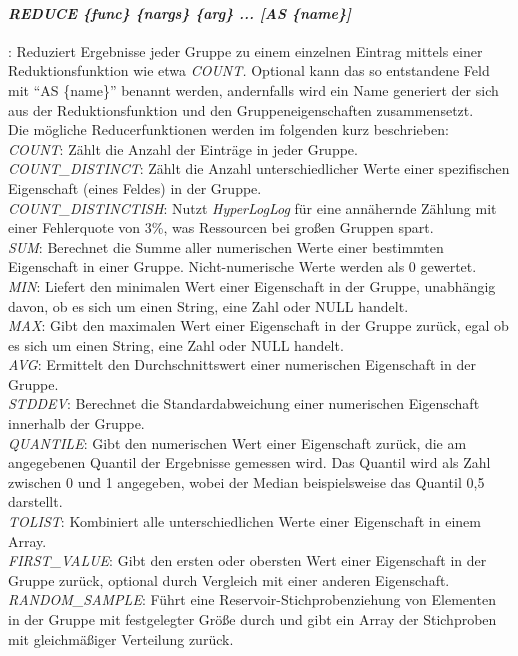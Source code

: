 \paragraph{\emph{REDUCE \{func\} \{nargs\} \{arg\} ... [AS \{name\}]}}: Reduziert Ergebnisse jeder Gruppe zu einem einzelnen Eintrag mittels einer Reduktionsfunktion wie etwa \emph{COUNT.} Optional kann das so entstandene Feld mit \enquote{AS \{name\}} benannt werden, andernfalls wird ein Name generiert der sich aus der Reduktionsfunktion und den Gruppeneigenschaften zusammensetzt.\\
Die mögliche Reducerfunktionen werden im folgenden kurz beschrieben:\\
\emph{COUNT}: Zählt die Anzahl der Einträge in jeder Gruppe.\\
\emph{COUNT\_DISTINCT}: Zählt die Anzahl unterschiedlicher Werte einer spezifischen Eigenschaft (eines Feldes) in der Gruppe.\\
\emph{COUNT\_DISTINCTISH}: Nutzt \emph{HyperLogLog} für eine annähernde Zählung mit einer Fehlerquote von 3\%, was Ressourcen bei großen Gruppen spart.\\
\emph{SUM}: Berechnet die Summe aller numerischen Werte einer bestimmten Eigenschaft in einer Gruppe. Nicht-numerische Werte werden als 0 gewertet.\\
\emph{MIN}: Liefert den minimalen Wert einer Eigenschaft in der Gruppe, unabhängig davon, ob es sich um einen String, eine Zahl oder NULL handelt.\\
\emph{MAX}: Gibt den maximalen Wert einer Eigenschaft in der Gruppe zurück, egal ob es sich um einen String, eine Zahl oder NULL handelt.\\
\emph{AVG}: Ermittelt den Durchschnittswert einer numerischen Eigenschaft in der Gruppe.\\
\emph{STDDEV}: Berechnet die Standardabweichung einer numerischen Eigenschaft innerhalb der Gruppe.\\
\emph{QUANTILE}: Gibt den numerischen Wert einer Eigenschaft zurück, die am angegebenen Quantil der Ergebnisse gemessen wird. Das Quantil wird als Zahl zwischen 0 und 1 angegeben, wobei der Median beispielsweise das Quantil 0,5 darstellt.\\
\emph{TOLIST}: Kombiniert alle unterschiedlichen Werte einer Eigenschaft in einem Array.\\
\emph{FIRST\_VALUE}: Gibt den ersten oder obersten Wert einer Eigenschaft in der Gruppe zurück, optional durch Vergleich mit einer anderen Eigenschaft.\\
\emph{RANDOM\_SAMPLE}: Führt eine Reservoir-Stichprobenziehung von Elementen in der Gruppe mit festgelegter Größe durch und gibt ein Array der Stichproben mit gleichmäßiger Verteilung zurück.


